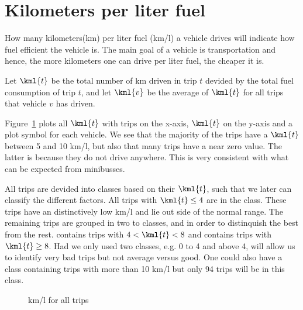 \section{Kilometers per liter fuel}

How many kilometers(km) per liter fuel (km/l) a vehicle drives will indicate how fuel efficient the vehicle is.
The main goal of a vehicle is transportation and hence, the more kilometers one can drive per liter fuel, the cheaper it is.

Let $\kml{t}$ be the total number of km driven in trip $t$ devided by the total fuel consumption of trip $t$, and let $\kml{v}$ be the average of $\kml{t}$ for all trips that vehicle $v$ has driven.

Figure~\ref{fig:kmlTrips} plots all $\kml{t}$ with trips on the x-axis, $\kml{t}$ on the y-axis and a plot symbol for each vehicle.
We see that the majority of the trips have a $\kml{t}$ between 5 and 10 km/l, but also that many trips have a near zero value.
The latter is because they do not drive anywhere.
This is very consistent with what can be expected from minibusses.

All trips are devided into classes based on their $\kml{t}$, such that we later can classify the different factors. %
All trips with $\kml{t}\leq4$ are in the \fuelLow class. These trips have an distinctively low km/l and lie out side of the normal range. 
The remaining trips are grouped in two to classes, \fuelMedium and \fuelHigh in order to distinquish the best from the rest.
\fuelMedium contains trips with $4 < \kml{t} < 8$ and \fuelHigh contains trips with $\kml{t}\geq8$.
Had we only used two classes, e.g. 0 to 4 and above 4, will allow us to identify very bad trips but not average versus good. 
One could also have a class containing trips with more than 10 km/l but only 94 trips will be in this class. %
\begin{figure}[htb]
\centering
\caption{km/l for all trips}
\label{fig:kmlTrips}
\end{figure}

